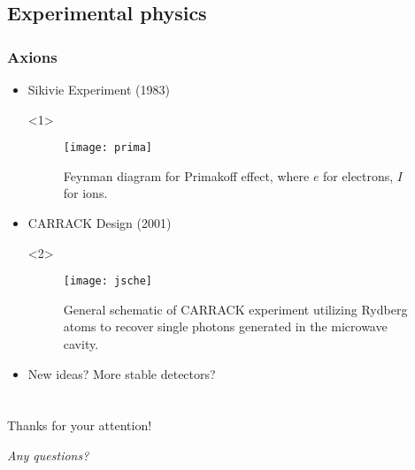 \documentclass{beamer}
\begin{document}
\subsection{Experimental physics}
\begin{frame}
  \frametitle{Axions}
  \begin{itemize}
  \item<1-> Sikivie Experiment (1983)
    \begin{onlyenv}<1>
      \begin{figure}
        \caption{Feynman diagram for Primakoff effect, where $e$ for
          electrons, $I$ for ions.} 
        \centering
        \texttt{[image: prima]}
      \end{figure}
    \end{onlyenv}
  \item<2-> CARRACK Design (2001)
    \begin{onlyenv}<2>
      \begin{figure}
        \centering
    \texttt{[image: jsche]}
    \caption{General schematic of CARRACK experiment utilizing Rydberg
      atoms to recover single photons generated in the microwave
      cavity.} 
      \end{figure}
    \end{onlyenv}
  \item<3-> New ideas? More stable detectors?
  \end{itemize}
\end{frame}

\section{}
\begin{frame}
  \begin{center}
    \Huge{\alert{Thanks for your attention!}}\par
    \Huge{\textit{Any questions?}}
  \end{center}
  
\end{frame}
\end{document}
